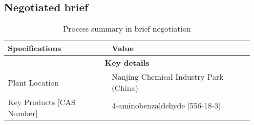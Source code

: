  \begin{landscape}
 
\section{Negotiated brief}
\label{app:breif}
\begin{table}[]
\centering
\caption{Process summary in brief negotiation}
\label{tab:brief}
\begin{tabular}{@{}|l|l|l|@{}}
\toprule
\multicolumn{2}{|l|}{\textbf{Specifications}}                              & \textbf{Value}                                                                                                                                                                                                                                                                                                                                                                                                        \\ \midrule
\multicolumn{3}{|c|}{\textbf{Key details}}                                                                                                                                                                                                                                                                                                                                                                                                                                                         \\ \midrule
\multicolumn{2}{|l|}{Plant Location}                                       & Nanjing Chemical Industry Park (China)                                                                                                                                                                                                                                                                                                                                                                                \\ \midrule
\multicolumn{2}{|l|}{\multirow{3}{*}{Key Products {[}CAS Number{]}}}       & 4-aminobenzaldehyde {[}556-18-3{]}                                                                                                                                                                                                                                                                                                                                                                                    \\ \cmidrule(l){3-3} 

\end{tabular}
\end{table}
\end{landscape}
